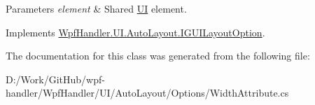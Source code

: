 \begin{DoxyParams}{Parameters}
{\em element} & Shared \mbox{\hyperlink{namespace_wpf_handler_1_1_u_i}{UI}} element.\\
\hline
\end{DoxyParams}


Implements \mbox{\hyperlink{interface_wpf_handler_1_1_u_i_1_1_auto_layout_1_1_i_g_u_i_layout_option_ac2d2fa8aeaf753b3248381399f991005}{Wpf\+Handler.\+U\+I.\+Auto\+Layout.\+I\+G\+U\+I\+Layout\+Option}}.



The documentation for this class was generated from the following file\+:\begin{DoxyCompactItemize}
\item 
D\+:/\+Work/\+Git\+Hub/wpf-\/handler/\+Wpf\+Handler/\+U\+I/\+Auto\+Layout/\+Options/Width\+Attribute.\+cs\end{DoxyCompactItemize}
